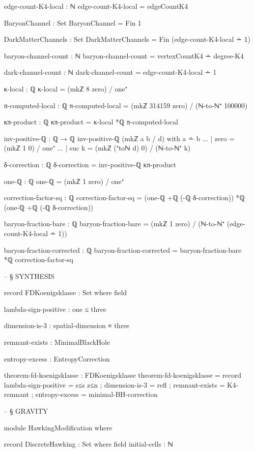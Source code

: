 \documentclass[11pt,a4paper]{book}
\begin{document}
\begin{code}
edge-count-K4-local : ℕ
edge-count-K4-local = edgeCountK4

BaryonChannel : Set
BaryonChannel = Fin 1

DarkMatterChannels : Set
DarkMatterChannels = Fin (edge-count-K4-local ∸ 1)

baryon-channel-count : ℕ
baryon-channel-count = vertexCountK4 ∸ degree-K4

dark-channel-count : ℕ
dark-channel-count = edge-count-K4-local ∸ 1

κ-local : ℚ
κ-local = (mkℤ 8 zero) / one⁺

π-computed-local : ℚ
π-computed-local = (mkℤ 314159 zero) / (ℕ-to-ℕ⁺ 100000)

κπ-product : ℚ
κπ-product = κ-local *ℚ π-computed-local

inv-positive-ℚ : ℚ → ℚ
inv-positive-ℚ (mkℤ a b / d) with a ∸ b
... | zero = (mkℤ 1 0) / one⁺
... | suc k = (mkℤ (⁺toℕ d) 0) / (ℕ-to-ℕ⁺ k)

δ-correction : ℚ
δ-correction = inv-positive-ℚ κπ-product

one-ℚ : ℚ
one-ℚ = (mkℤ 1 zero) / one⁺

correction-factor-sq : ℚ
correction-factor-sq = (one-ℚ +ℚ (-ℚ δ-correction)) *ℚ (one-ℚ +ℚ (-ℚ δ-correction))

baryon-fraction-bare : ℚ
baryon-fraction-bare = (mkℤ 1 zero) / (ℕ-to-ℕ⁺ (edge-count-K4-local ∸ 1))

baryon-fraction-corrected : ℚ
baryon-fraction-corrected = baryon-fraction-bare *ℚ correction-factor-sq


-- § SYNTHESIS

record FDKoenigsklasse : Set where
  field
    
    lambda-sign-positive : one ≤ three
    
    dimension-is-3 : spatial-dimension ≡ three
    
    remnant-exists : MinimalBlackHole
    
    entropy-excess : EntropyCorrection
    
theorem-fd-koenigsklasse : FDKoenigsklasse
theorem-fd-koenigsklasse = record
  { lambda-sign-positive = s≤s z≤n
  ; dimension-is-3 = refl
  ; remnant-exists = K4-remnant
  ; entropy-excess = minimal-BH-correction
  }


-- § GRAVITY

module HawkingModification where

  record DiscreteHawking : Set where
    field
      initial-cells : ℕ
      

\end{code}
\end{document}
